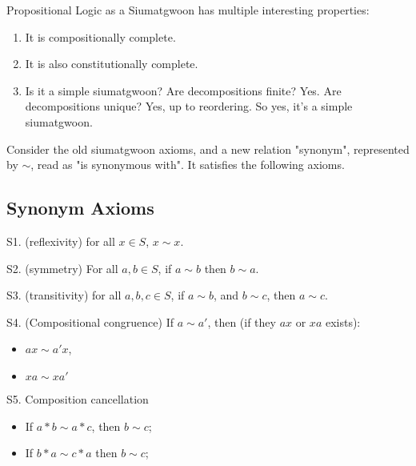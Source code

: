 Propositional Logic as a Siumatgwoon has multiple interesting properties: 

\begin{enumerate}
\item It is compositionally complete. 
\item It is also constitutionally complete. 
\item Is it a simple siumatgwoon? Are decompositions finite? Yes. Are decompositions unique? Yes, up to reordering. So yes, it's a simple siumatgwoon.


\end{enumerate}

Consider the old siumatgwoon axioms, and a new relation "synonym", represented by $\sim$, read as "is synonymous with". It satisfies the following axioms.

\subsection{Synonym Axioms}

\begin{axiom}[Reflexivity]\label{ax:syn-reflex}
S1. (reflexivity) for all $x\in S$, $x\sim x$.
\end{axiom}

\begin{axiom}[Symmetry]\label{ax:syn-sym}
S2. (symmetry) For all $a,b\in S$, if $a\sim b$ then $b\sim a$.
\end{axiom}

\begin{axiom}[Transitivity]\label{ax:syn-trans}
S3. (transitivity) for all $a,b,c \in S$, if $a\sim b$, and $b \sim c$, then $a \sim c$.
\end{axiom}

\begin{axiom}\label{ax:syn-comp}
S4. (Compositional congruence) If $a \sim a'$, then (if they $ax$ or $xa$ exists):
\begin{itemize}
\item $ax \sim a'x$,
\item $xa \sim xa'$
\end{itemize}
\end{axiom}

\begin{axiom}\label{ax:syn-cancel}
S5. Composition cancellation
\begin{itemize}
\item If $a * b \sim a * c$, then $b \sim c$;
\item If $b*a\sim c*a$ then $b \sim c$;
\end{itemize}
\end{axiom}

